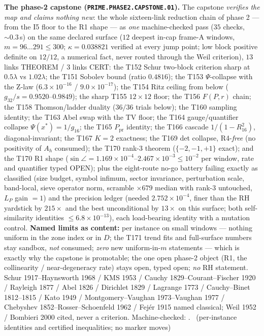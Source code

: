 \par\smallskip\noindent\textbf{The phase-2 capstone
(\texttt{PRIME.PHASE2.CAPSTONE.01}).}
The capstone \emph{verifies the map and claims nothing new}: the whole
sixteen-link reduction chain of phase 2 --- from the I5 floor to the R1
shape --- as \emph{one} machine-checked pass ($35$ checks,
${\sim}0.3$\,s) on the same declared surface ($12$ deepest in-cap
frame-A windows, $m=96\ldots291\le300$; $\kappa=0.038821$ verified at
every jump point; low block positive definite on $12/12$, a numerical
fact, never routed through the Weil criterion), $13$ links THEOREM /
$3$ links CERT: the T152 Schur two-block criterion sharp at
$0.5\lambda$ vs $1.02\lambda$; the T151 Sobolev bound (ratio
$0.4816$); the T153 $\Psi$-collapse with the Z-law
($6.3\times10^{-16}$ / $9.0\times10^{-17}$); the T154 Ritz ceiling
from below ($g_{32}/s=0.9520$--$0.9849$); the sharp T155 $12\times12$
floor; the T156 $F(P,r)$ chain; the T158 Thomson/ladder duality
($36/36$ trials below); the T160 sampling identity; the T163 Abel
swap with the TV floor; the T164 gauge/quantifier collapse
$\Psi(x^*)=1/g_{16}$; the T165 $P_{\mathrm{pr}}$ identity; the T166
cascade $1/(1-R_{16}^2)$, diagonal-invariant; the T167 $K=2$
exactness; the T169 det collapse, R4-\emph{free} (no positivity of
$A_h$ consumed); the T170 rank-3 theorem ($\{-2,-1,+1\}$ exact); and
the T170 R1 shape ($\sin\angle=1.169\times10^{-4}$--$2.467\times
10^{-3}\le10^{-2}$ per window, rate and quantifier typed OPEN); plus
the eight-route no-go battery failing exactly as classified (size
budget, symbol infimum, sector invariance, perturbation scale,
band-local, sieve operator norm, scramble $\times679$ median with
rank-3 untouched, $L_P$ gain $=1$) and the precision ledger (needed
$2.752\times10^{-4}$, finer than the RH yardstick by $215\times$ and
the best unconditional by $13\times$ on this surface; both
self-similarity identities $\le6.8\times10^{-13}$), each load-bearing
identity with a mutation control.
\textbf{Named limits as content:} per instance on small windows ---
nothing uniform in the zone index or in $D$; the T171 trend fits and
full-surface numbers stay sandbox, \emph{not} consumed; \emph{zero}
new uniform-in-$m$ statements --- which is exactly why the capstone is
promotable; the one open phase-2 object (R1, the collinearity /
near-degeneracy rate) stays open, typed open; \emph{no} RH statement.
Schur 1917--Haynsworth 1968 / KMS 1953 / Cauchy 1829--Courant--Fischer
1920 / Rayleigh 1877 / Abel 1826 / Dirichlet 1829 / Lagrange 1773 /
Cauchy--Binet 1812--1815 / Kato 1949 / Montgomery--Vaughan
1973--Vaughan 1977 / Chebyshev 1852--Rosser--Schoenfeld 1962 /
Fej\'er 1915 named classical; Weil 1952 / Bombieri 2000 cited, never a
criterion. Machine-checked:
.
\mE\ (per-instance identities and certified inequalities; no marker moves)
\par\smallskip


